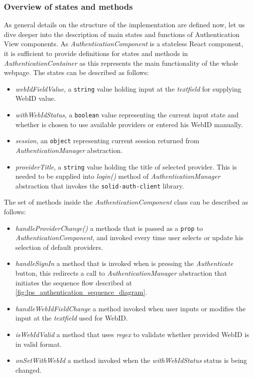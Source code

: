 \subsubsection{Overview of states and methods}

As general details on the structure of the implementation are defined now, let us dive deeper into the description of main states and functions of Authentication View components. As \textit{AuthenticationComponent} is a stateless React component, it is sufficient to provide definitions for states and methods in \textit{AuthenticationContainer} as this represents the main functionality of the whole webpage. The states can be described as follows:
\begin{itemize}
    \item \textit{webIdFieldValue}, a \texttt{string} value holding input at the \textit{textfield} for supplying WebID value.
    \item \textit{withWebIdStatus}, a \texttt{boolean} value representing the current input state and whether is chosen to use available providers or entered his WebID manually.
    \item \textit{session}, an \texttt{object} representing current session returned from \textit{AuthenticationManager} abstraction.
    \item \textit{providerTitle}, a \texttt{string} value holding the title of selected provider. This is needed to be supplied into \textit{login()} method of \textit{AuthenticationManager} abstraction that invokes the \texttt{solid-auth-client} library.  
\end{itemize}

The set of methods inside the \textit{AuthenticationComponent} class can be described as follows:
\begin{itemize}
    \item \textit{handleProviderChange()} a methods that is passed as a \texttt{prop} to \textit{AuthenticationComponent}, and invoked every time user selects or update his selection of default providers.
    \item \textit{handleSignIn} a method that is invoked when is pressing the \textit{Authenticate} button, this redirects a call to \textit{AuthenticationManager} abstraction that initiates the sequence flow described at \autoref{fig:lps_authentication_sequence_diagram}.
    \item \textit{handleWebIdFieldChange} a method invoked when user inputs or modifies the input at the \textit{textfield} used for WebID.
    \item \textit{isWebIdValid} a method that uses \textit{regex} to validate whether provided WebID is in valid format.
    \item \textit{onSetWithWebId} a method invoked when the \textit{withWebIdStatus} status is being changed.  
\end{itemize}

